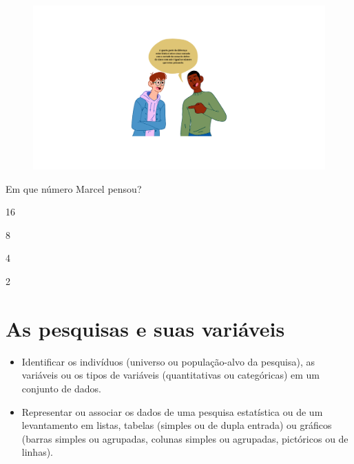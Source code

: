 \begin{figure}[htpb!]
\includegraphics[width=\textwidth]{../ilustracoes/MAT5/SAEB_5ANO_MAT_figura94.png}
\end{figure}

Em que número Marcel pensou?

\begin{escolha}
\item
  16
\item
  8
\item
  4
\item
  2
\end{escolha}



\chapter{As pesquisas e suas variáveis}


\begin{itemize}
\item Identificar os indivíduos (universo ou população-alvo da pesquisa),
as variáveis ou os tipos de variáveis (quantitativas ou categóricas) em 
um conjunto de dados.

\item Representar ou associar os dados de uma pesquisa estatística ou
de um levantamento em listas, tabelas (simples ou de dupla entrada) ou
gráficos (barras simples ou agrupadas, colunas simples ou agrupadas,
pictóricos ou de linhas).
\end{itemize}

